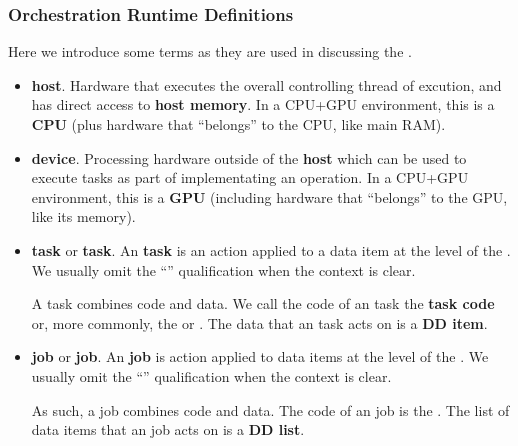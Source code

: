 \documentclass{article}
\begin{document}
\subsubsection[\shortOR Definitions]{Orchestration Runtime Definitions}
\label{sec:ORCodeTerminology}


Here we introduce some terms as they are used in discussing the \spelledoutOR.
\begin{itemize}
\item \textbf{host}. Hardware that executes the overall controlling thread
   of excution, and has direct access to \textbf{host memory}.
   In a CPU+GPU environment, this is a \textbf{CPU} (plus hardware
   that ``belongs'' to the CPU, like main RAM).
\item \textbf{device}. Processing hardware outside of the \textbf{host}
   which can be used to execute tasks as part of implementating
   an operation.
   In a CPU+GPU environment, this is a \textbf{GPU} (including hardware
   that ``belongs'' to the GPU, like its memory).
\item \textbf{task} or \textbf{\shortOR task}.
An \textbf{\shortOR task} is an action applied to a data item at the level of the \OR.
We usually omit the ``\textbf{\shortOR}'' qualification when the context is clear.

A task combines code and data.
We call the code of an \shortOR task the \textbf{task code} or, more commonly, the \textbf{\taskroutine}
or \textbf{\actionroutine}. The data that an \shortOR task acts on is a \textbf{DD item}.

\item \textbf{job} or \textbf{\shortOR job}.
An \textbf{\shortOR job} is action applied to data items at the level of the \OR.
We usually omit the ``\textbf{\shortOR}'' qualification when the context is clear.

As such, a job combines code and data.
The code of an \shortOR job is the
\textbf{\actionroutine}. The list of data items that an \shortOR job acts on is a \textbf{DD list}.



\end{itemize}
\end{document}
